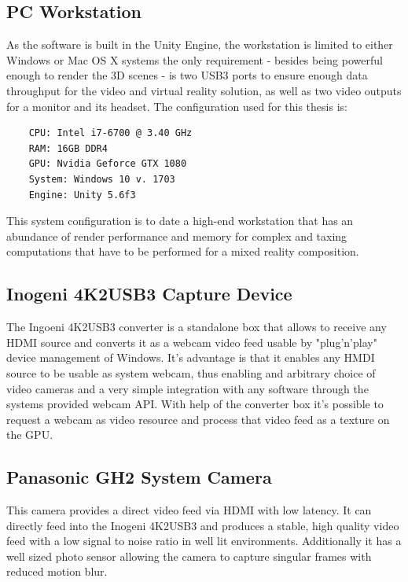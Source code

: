 \subsection{PC Workstation}

As the software is built in the Unity Engine, the workstation is limited to 
either Windows or Mac OS X systems the only requirement - besides being 
powerful enough to render the 3D scenes - is two USB3 ports to ensure enough 
data throughput for the video and virtual reality solution, as well as two 
video outputs for a monitor and its headset.
\newline
The configuration used for this thesis is:
\begin{lstlisting}
	CPU: Intel i7-6700 @ 3.40 GHz
	RAM: 16GB DDR4
	GPU: Nvidia Geforce GTX 1080
	System: Windows 10 v. 1703
	Engine: Unity 5.6f3
\end{lstlisting}

This system configuration is to date a high-end workstation that has an 
abundance of render performance and memory for complex and taxing computations 
that have to be performed for a mixed reality composition. 

\subsection{Inogeni 4K2USB3 Capture Device}
The Ingoeni 4K2USB3 converter is a standalone box that allows to receive any 
HDMI source and converts it as a webcam video feed usable by "plug'n'play" 
device management of Windows. It's advantage is that it enables any HMDI source 
to be usable as system webcam, thus enabling and arbitrary choice of video 
cameras and a very simple integration with any software through the systems 
provided webcam API. With help of the converter box it's possible to request a 
webcam as video resource and process that video feed as a texture on the GPU.

\subsection{Panasonic GH2 System Camera}
This camera provides a direct video feed via HDMI with low latency. It can 
directly feed into the Inogeni 4K2USB3 and produces a stable, high quality 
video feed with a low signal to noise ratio in well lit environments. 
Additionally it has a well sized photo sensor allowing the camera to capture 
singular frames with reduced motion blur.

